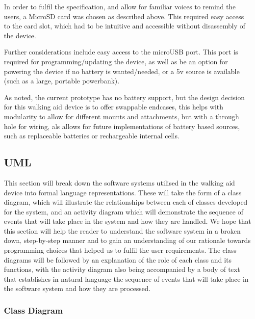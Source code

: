            In order to fulfil the specification, and allow for familiar voices to remind the users, a MicroSD card was chosen as described above. This required easy access to the card slot, which had to be intuitive and accessible without disassembly of the device.

            Further considerations include easy access to the microUSB port. This port is required for programming/updating the device, as well as be an option for powering the device if no battery is wanted/needed, or a 5v source is available (such as a large, portable powerbank).

            As noted, the current prototype has no battery support, but the design decision for this walking aid device is to offer swappable endcases, this helps with modularity to allow for different mounts and attachments, but with a through hole for wiring, als allows for future implementations of battery based sources, such as replaceable batteries or rechargeable internal cells.

        \subsection{UML}
        \label{sec:uml_walk_aid}
        
            This section will break down the software systems utilised in the walking aid device into formal language representations. These will take the form of a class diagram, which will illustrate the relationships between each of classes developed for the system, and an activity diagram which will demonstrate the sequence of events that will take place in the system and how they are handled. We hope that this section will help the reader to understand the software system in a broken down, step-by-step manner and to gain an understanding of our rationale towards programming choices that helped us to fulfil the user requirements. The class diagrams will be followed by an explanation of the role of each class and its functions, with the activity diagram also being accompanied by a body of text that establishes in natural language the sequence of events that will take place in the software system and how they are processed.

            \subsubsection{Class Diagram}
            \label{subsubsec:class_diagram_walking_aid}

